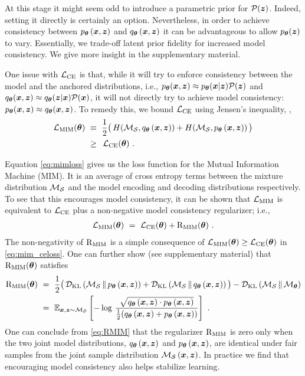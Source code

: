 At this stage it might seem odd to introduce a parametric prior for $\mathcal{P}({\boldsymbol z})$.
Indeed, setting it directly is certainly an option.
Nevertheless, in order to achieve consistency between $p_{{\boldsymbol \theta}} \left({\boldsymbol{x}}, {\boldsymbol z} \right)$ and $q_{{\boldsymbol \theta}} \left({\boldsymbol{x}}, {\boldsymbol z} \right)$
it can be advantageous to allow $p_{{\boldsymbol \theta}}({\boldsymbol z})$ to vary.
Essentially, we trade-off latent prior fidelity for increased model consistency.
We give more insight in the supplementary material. 

One issue with $\mathcal{L}_\text{CE}$ is that, while it will try to enforce consistency
between the model and the anchored distributions, i.e.,
$p_{{\boldsymbol \theta}} ({\boldsymbol{x}}, {\boldsymbol z} ) \approx p_{{\boldsymbol \theta}}({\boldsymbol{x}} | {\boldsymbol z})\mathcal{P}({\boldsymbol z})$ and
$q_{{\boldsymbol \theta}}({\boldsymbol{x}}, {\boldsymbol z}) \approx q_{{\boldsymbol \theta}}({\boldsymbol z} | {\boldsymbol{x}})\mathcal{P}({\boldsymbol{x}})$, it will not directly
try to achieve model consistency: $p_{{\boldsymbol \theta}} ({\boldsymbol{x}}, {\boldsymbol z} ) \approx q_{{\boldsymbol \theta}}({\boldsymbol{x}}, {\boldsymbol z})$.
To remedy this, we bound $\mathcal{L}_\text{CE}$ using Jensen's inequality, \ie,
\begin{align}
    \MIMloss(\params)~ &\equiv ~\frac{1}{2}
    \big(\, H(\Msamp, \Menc \left(\x, \z \right) ) + H(\Msamp, \Mdec \left(\x, \z \right)) \, \big)
    \label{eq:mimloss}  \\
    &\geq ~\,  \CEloss(\params) ~.
    \label{eq:mim_celoss}
\end{align}

Equation \eqref{eq:mimloss} gives us the loss function for the Mutual Information 
Machine (MIM).  It is an average of cross entropy terms between the mixture 
distribution $\mathcal{M}_{\mathcal{S}}$ and the model encoding and decoding distributions respectively.
To see that this encourages model consistency, it can be shown that $\mathcal{L}_\text{MIM}$ is
equivalent to $\mathcal{L}_\text{CE}$ plus a non-negative model consistency regularizer; i.e.,
\begin{align}
    \MIMloss(\params) ~= ~\CEloss(\params) + \RMIM(\params) ~.
    \label{eq:LMIM-LCE}
\end{align}
The non-negativity of $\mathrm{R}_{\mathrm{MIM}}$ is a simple consequence of 
$\mathcal{L}_\text{MIM}({\boldsymbol \theta}) \ge \mathcal{L}_\text{CE}({\boldsymbol \theta})$ in \eqref{eq:mim_celoss}.
One can further show (see supplementary material) that $\mathrm{R}_{\mathrm{MIM}}({\boldsymbol \theta})$ satisfies
\begin{align}
    \RMIM(\params) ~& = ~\frac{1}{2}
    \big(\,\DKL{\Msamp}{\Mdecjoint} + \DKL{\Msamp}{\Mencjoint} \big) - \DKL{\Msamp}{\Mmodel} \label{eq:RMIM-DKL}  \\
    &= ~ \E{\x,\z \sim \Msamp}{-\log \, \frac{\sqrt{\Menc \left(\x, \z \right) \cdot \Mdec \left(\x, \z \right)}}{\frac{1}{2} (\Menc \left(\x, \z \right) + \Mdec \left(\x, \z \right))} } 
    ~ .
    \label{eq:RMIM}
\end{align}
One can conclude from \eqref{eq:RMIM} that the regularizer $\mathrm{R}_{\mathrm{MIM}}$ is zero 
only when the two joint model distributions, $q_{{\boldsymbol \theta}} \left({\boldsymbol{x}}, {\boldsymbol z} \right)$
and $p_{{\boldsymbol \theta}} \left({\boldsymbol{x}}, {\boldsymbol z} \right)$, are identical under fair samples from 
the joint sample distribution $\mathcal{M}_{\mathcal{S}} \left({\boldsymbol{x}}, {\boldsymbol z} \right)$.
In practice we find that encouraging model consistency also helps stabilize learning.

